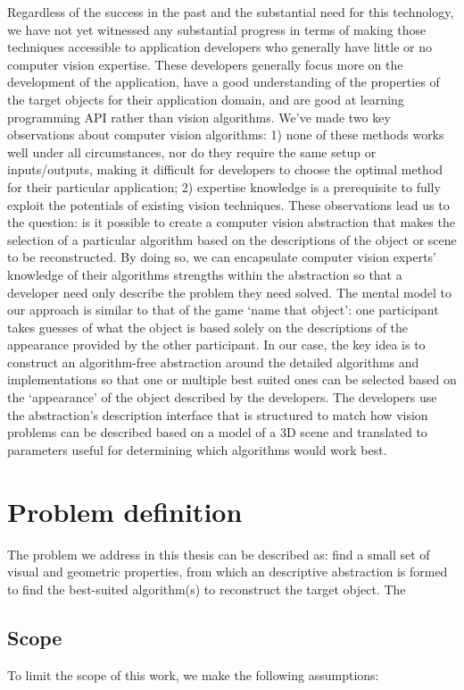 Regardless of the success in the past and the substantial need for this technology, we have not yet witnessed any substantial progress in terms of making those techniques accessible to application developers who generally have little or no computer vision expertise. These developers generally focus more on the development of the application, have a good understanding of the properties of the target objects for their application domain, and are good at learning programming API rather than vision algorithms. We've made two key observations about computer vision algorithms: 1) none of these methods works well under all circumstances, nor do they require the same setup or inputs/outputs, making it difficult for developers to choose the optimal method for their particular application; 2) expertise knowledge is a prerequisite to fully exploit the potentials of existing vision techniques. These observations lead us to the question: is it possible to create a computer vision abstraction that makes the selection of a particular algorithm based on the descriptions of the object or scene to be reconstructed. By doing so, we can encapsulate computer vision experts' knowledge of their algorithms strengths within the abstraction so that a developer need only describe the problem they need solved. The mental model to our approach is similar to that of the game `name that object': one participant takes guesses of what the object is based solely on the descriptions of the appearance provided by the other participant. In our case, the key idea is to construct an algorithm-free abstraction around the detailed algorithms and implementations so that one or multiple best suited ones can be selected based on the `appearance' of the object described by the developers. The developers use the abstraction's description interface that is structured to match how vision problems can be described based on a model of a 3D scene and translated to parameters useful for determining which algorithms would work best.

\section{Problem definition}
The problem we address in this thesis can be described as: find a small set of visual and geometric properties, from which an descriptive abstraction is formed to find the best-suited algorithm(s) to reconstruct the target object. The 

\subsection{Scope}
To limit the scope of this work, we make the following assumptions:

